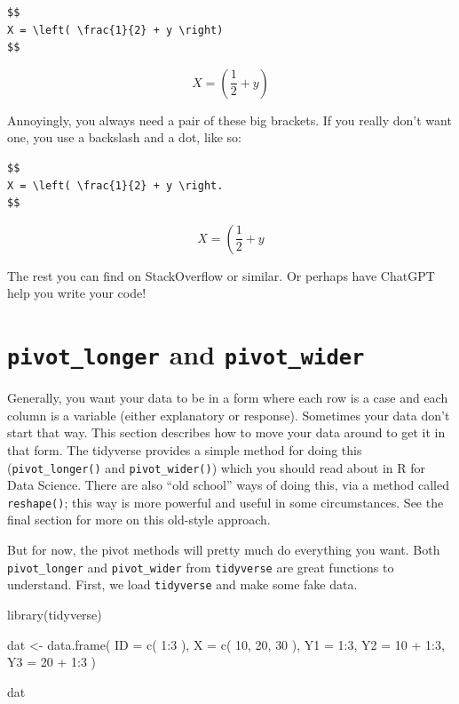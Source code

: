 \documentclass[
  letterpaper,
  DIV=11,
  numbers=noendperiod]{scrreprt}
\newenvironment{Shaded}{}{}
\newcommand{\AttributeTok}[1]{\textcolor[rgb]{0.49,0.56,0.16}{#1}}
\newcommand{\DecValTok}[1]{\textcolor[rgb]{0.25,0.63,0.44}{#1}}
\newcommand{\FunctionTok}[1]{\textcolor[rgb]{0.02,0.16,0.49}{#1}}
\newcommand{\NormalTok}[1]{#1}
\newcommand{\OtherTok}[1]{\textcolor[rgb]{0.00,0.44,0.13}{#1}}
\newcommand{\SpecialCharTok}[1]{\textcolor[rgb]{0.25,0.44,0.63}{#1}}
\begin{document}
\begin{verbatim}
$$
X = \left( \frac{1}{2} + y \right)
$$
\end{verbatim}

\[
X = \left( \frac{1}{2} + y \right)
\]

Annoyingly, you always need a pair of these big brackets. If you really
don't want one, you use a backslash and a dot, like so:

\begin{verbatim}
$$
X = \left( \frac{1}{2} + y \right.
$$
\end{verbatim}

\[
X = \left( \frac{1}{2} + y \right.
\]

The rest you can find on StackOverflow or similar. Or perhaps have
ChatGPT help you write your code!

\chapter{\texorpdfstring{\texttt{pivot\_longer} and
\texttt{pivot\_wider}}{pivot\_longer and pivot\_wider}}\label{pivot_longer-and-pivot_wider}

Generally, you want your data to be in a form where each row is a case
and each column is a variable (either explanatory or response).
Sometimes your data don't start that way. This section describes how to
move your data around to get it in that form. The tidyverse provides a
simple method for doing this (\texttt{pivot\_longer()} and
\texttt{pivot\_wider()}) which you should read about in R for Data
Science. There are also ``old school'' ways of doing this, via a method
called \texttt{reshape()}; this way is more powerful and useful in some
circumstances. See the final section for more on this old-style
approach.

But for now, the pivot methods will pretty much do everything you want.
Both \texttt{pivot\_longer} and \texttt{pivot\_wider} from
\texttt{tidyverse} are great functions to understand. First, we load
\texttt{tidyverse} and make some fake data.

\begin{Shaded}
\begin{Highlighting}[]
\FunctionTok{library}\NormalTok{(tidyverse)}

\NormalTok{dat }\OtherTok{\textless{}{-}} \FunctionTok{data.frame}\NormalTok{( }\AttributeTok{ID =} \FunctionTok{c}\NormalTok{( }\DecValTok{1}\SpecialCharTok{:}\DecValTok{3}\NormalTok{ ), }
                  \AttributeTok{X =} \FunctionTok{c}\NormalTok{( }\DecValTok{10}\NormalTok{, }\DecValTok{20}\NormalTok{, }\DecValTok{30}\NormalTok{ ),}
                  \AttributeTok{Y1 =} \DecValTok{1}\SpecialCharTok{:}\DecValTok{3}\NormalTok{,}
                  \AttributeTok{Y2 =} \DecValTok{10} \SpecialCharTok{+} \DecValTok{1}\SpecialCharTok{:}\DecValTok{3}\NormalTok{,}
                  \AttributeTok{Y3 =} \DecValTok{20} \SpecialCharTok{+} \DecValTok{1}\SpecialCharTok{:}\DecValTok{3}\NormalTok{ )}

\NormalTok{dat}
\end{Highlighting}
\end{Shaded}
\end{document}
